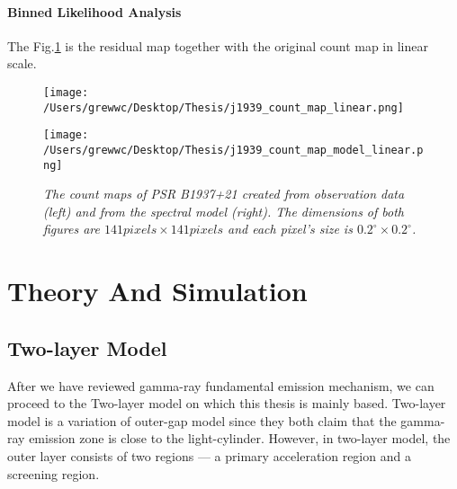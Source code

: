 \documentclass[12pt]{report}
\newcommand{\mycaption}[1]{\caption{\textit{\footnotesize #1}}}
\begin{document}
        \subsubsection{Binned Likelihood Analysis}
          The Fig.\ref{fig: j1939_count_map_diff} is the residual map together with the 
          original count map in linear scale.
          \begin{figure}[!ht]
            \begin{center}
            \begin{minipage}{0.45\textwidth}
              \begin{center} 
                \texttt{[image: /Users/grewwc/Desktop/Thesis/j1939\_count\_map\_linear.png]}
              \end{center}
            \end{minipage}
            \begin{minipage}{0.45\textwidth}
              \begin{center}
                \texttt{[image: /Users/grewwc/Desktop/Thesis/j1939\_count\_map\_model\_linear.png]}
              \end{center}
            \end{minipage}
          \end{center}
          \mycaption{The count maps of PSR B1937+21 created from observation 
          data (\textsf{left}) and from the spectral model (\textsf{right}). The dimensions
          of both figures are $141 pixels \times 141 pixels$ and each pixel's size is
          $0.2^{\circ}\times0.2^{\circ}$.}
          \label{fig: j1939_count_map_diff}
        \end{figure}
        \vspace{1cm}

    \chapter{Theory And Simulation}
      \section{Two-layer Model}
      After we have reviewed gamma-ray fundamental emission mechanism, we can proceed to
      the Two-layer model on which this thesis is mainly based. Two-layer model is a 
      variation of outer-gap model since they both claim that the gamma-ray emission zone
      is close to the light-cylinder. However, in two-layer model, the outer layer 
      consists of two regions --- a primary acceleration region and a screening region. 
\end{document}
